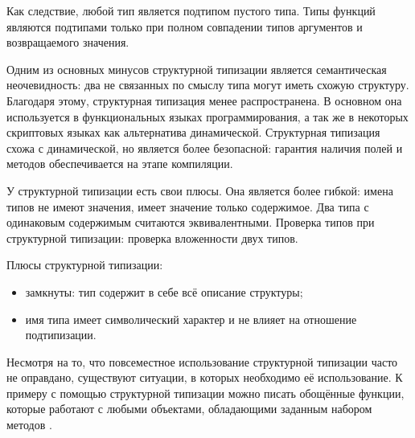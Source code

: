 Как следствие, любой тип является подтипом пустого типа. Типы функций являются подтипами только при полном совпадении типов аргументов и возвращаемого значения.

Одним из основных минусов структурной типизации является семантическая неочевидность: два не связанных по смыслу типа могут иметь схожую структуру. Благодаря этому, структурная типизация менее распространена. В основном она используется в функциональных языках программирования, а так же в некоторых скриптовых языках как альтернатива динамической. Структурная типизация схожа с динамической, но является более безопасной: гарантия наличия полей и методов обеспечивается на этапе компиляции.

У структурной типизации есть свои плюсы. Она является более гибкой: имена типов не имеют значения, имеет значение только содержимое. Два типа с одинаковым содержимым считаются эквивалентными. Проверка типов при структурной типизации: проверка вложенности двух типов.

Плюсы структурной типизации:
\begin{itemize}
    \item замкнуты: тип содержит в себе всё описание структуры;
    \item имя типа имеет символический характер и не влияет на отношение подтипизации.
\end{itemize}

Несмотря на то, что повсеместное использование структурной типизации часто не оправдано, существуют ситуации, в которых необходимо её использование. К примеру с помощью структурной типизации можно писать обощённые функции, которые работают с любыми объектами, обладающими заданным набором методов \cite{JOT:issue_2008_01/article4}.
